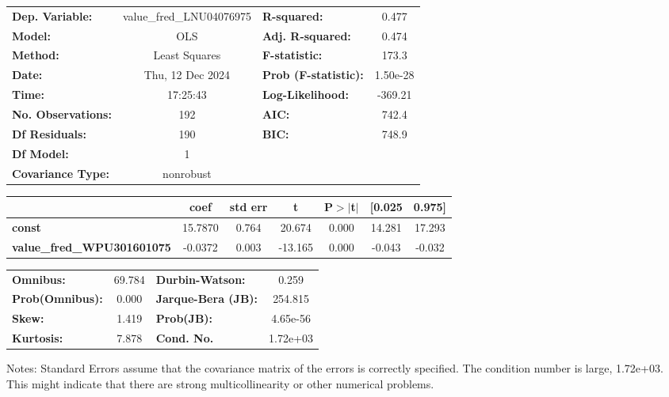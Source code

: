 \begin{center}
\begin{tabular}{lclc}
\toprule
\textbf{Dep. Variable:}            & value\_fred\_LNU04076975 & \textbf{  R-squared:         } &     0.477   \\
\textbf{Model:}                    &           OLS            & \textbf{  Adj. R-squared:    } &     0.474   \\
\textbf{Method:}                   &      Least Squares       & \textbf{  F-statistic:       } &     173.3   \\
\textbf{Date:}                     &     Thu, 12 Dec 2024     & \textbf{  Prob (F-statistic):} &  1.50e-28   \\
\textbf{Time:}                     &         17:25:43         & \textbf{  Log-Likelihood:    } &   -369.21   \\
\textbf{No. Observations:}         &             192          & \textbf{  AIC:               } &     742.4   \\
\textbf{Df Residuals:}             &             190          & \textbf{  BIC:               } &     748.9   \\
\textbf{Df Model:}                 &               1          & \textbf{                     } &             \\
\textbf{Covariance Type:}          &        nonrobust         & \textbf{                     } &             \\
\bottomrule
\end{tabular}
\begin{tabular}{lcccccc}
                                   & \textbf{coef} & \textbf{std err} & \textbf{t} & \textbf{P$> |$t$|$} & \textbf{[0.025} & \textbf{0.975]}  \\
\midrule
\textbf{const}                     &      15.7870  &        0.764     &    20.674  &         0.000        &       14.281    &       17.293     \\
\textbf{value\_fred\_WPU301601075} &      -0.0372  &        0.003     &   -13.165  &         0.000        &       -0.043    &       -0.032     \\
\bottomrule
\end{tabular}
\begin{tabular}{lclc}
\textbf{Omnibus:}       & 69.784 & \textbf{  Durbin-Watson:     } &    0.259  \\
\textbf{Prob(Omnibus):} &  0.000 & \textbf{  Jarque-Bera (JB):  } &  254.815  \\
\textbf{Skew:}          &  1.419 & \textbf{  Prob(JB):          } & 4.65e-56  \\
\textbf{Kurtosis:}      &  7.878 & \textbf{  Cond. No.          } & 1.72e+03  \\
\bottomrule
\end{tabular}
\end{center}

Notes: \newline
 [1] Standard Errors assume that the covariance matrix of the errors is correctly specified. \newline
 [2] The condition number is large, 1.72e+03. This might indicate that there are \newline
 strong multicollinearity or other numerical problems.